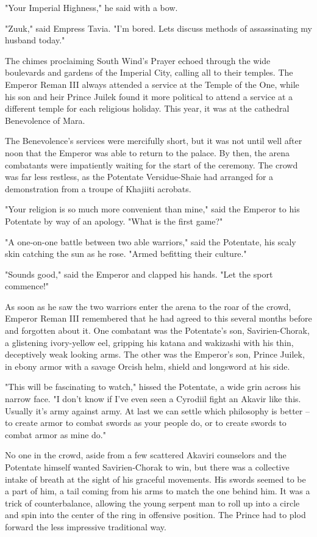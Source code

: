 "Your Imperial Highness," he said with a bow.

"Zuuk," said Empress Tavia. "I'm bored. Lets discuss methods of assassinating my husband today."

The chimes proclaiming South Wind's Prayer echoed through the wide boulevards and gardens of the Imperial City, calling all to their temples. The Emperor Reman III always attended a service at the Temple of the One, while his son and heir Prince Juilek found it more political to attend a service at a different temple for each religious holiday. This year, it was at the cathedral Benevolence of Mara.

The Benevolence's services were mercifully short, but it was not until well after noon that the Emperor was able to return to the palace. By then, the arena combatants were impatiently waiting for the start of the ceremony. The crowd was far less restless, as the Potentate Versidue-Shaie had arranged for a demonstration from a troupe of Khajiiti acrobats.

"Your religion is so much more convenient than mine," said the Emperor to his Potentate by way of an apology. "What is the first game?"

"A one-on-one battle between two able warriors," said the Potentate, his scaly skin catching the sun as he rose. "Armed befitting their culture."

"Sounds good," said the Emperor and clapped his hands. "Let the sport commence!"

As soon as he saw the two warriors enter the arena to the roar of the crowd, Emperor Reman III remembered that he had agreed to this several months before and forgotten about it. One combatant was the Potentate's son, Savirien-Chorak, a glistening ivory-yellow eel, gripping his katana and wakizashi with his thin, deceptively weak looking arms. The other was the Emperor's son, Prince Juilek, in ebony armor with a savage Orcish helm, shield and longsword at his side.

"This will be fascinating to watch," hissed the Potentate, a wide grin across his narrow face. "I don't know if I've even seen a Cyrodiil fight an Akavir like this. Usually it's army against army. At last we can settle which philosophy is better -- to create armor to combat swords as your people do, or to create swords to combat armor as mine do."

No one in the crowd, aside from a few scattered Akaviri counselors and the Potentate himself wanted Savirien-Chorak to win, but there was a collective intake of breath at the sight of his graceful movements. His swords seemed to be a part of him, a tail coming from his arms to match the one behind him. It was a trick of counterbalance, allowing the young serpent man to roll up into a circle and spin into the center of the ring in offensive position. The Prince had to plod forward the less impressive traditional way.

